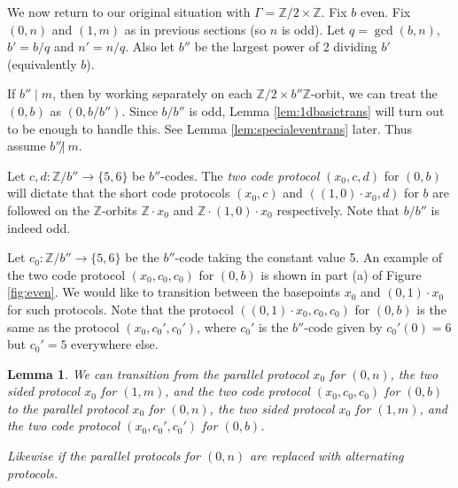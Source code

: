 \documentclass[10pt,a4paper]{article}
\newcommand{\0}{\varnothing}
\newcommand{\Z}{\mathbb{Z}}
\newtheorem{lemma}{Lemma}
\begin{document}
We now return to our original situation with $\Gamma = \Z/2 \times \Z$. Fix $b$ even. Fix $(0,n)$ and $(1,m)$ as in previous sections (so $n$ is odd). Let $q = \gcd(b,n)$, $b' = b/q$ and $n' = n/q$. Also let $b''$ be the largest power of 2 dividing $b'$ (equivalently $b$).

If $b'' \mid m$, then by working separately on each $\Z/2 \times b''\Z$-orbit, we can treat the $(0,b)$ as $(0,b/b'')$. Since $b/b''$ is odd, Lemma \ref{lem:1dbasictrans} will turn out to be enough to handle this. See Lemma \ref{lem:specialeventrans} later. Thus assume $b'' \not|\ m$.




Let $c,d :\Z/b'' \rightarrow \{5,6\}$ be $b''$-codes. The \textit{two code protocol} $(x_0,c,d)$ for $(0,b)$ will dictate that the short code protocols $(x_0,c)$ and $((1,0) \cdot x_0, d)$ for $b$ are followed on the $\Z$-orbits $\Z \cdot x_0$ and $\Z \cdot (1,0) \cdot x_0$ respectively. Note that $b/b''$ is indeed odd.

Let $c_0:\Z/b'' \rightarrow \{5,6\}$ be the $b''$-code taking the constant value 5. An example of the two code protocol $(x_0,c_0,c_0)$ for $(0,b)$ is shown in part (a) of Figure \ref{fig:even}. We would like to transition between the basepoints $x_0$ and $(0,1) \cdot x_0$ for such protocols. Note that the protocol $((0,1) \cdot x_0,c_0,c_0)$ for $(0,b)$ is the same as the protocol $(x_0,c_0',c_0')$, where $c_0'$ is the $b''$-code given by $c_0'(0) = 6$ but $c_0' = 5$ everywhere else.

\begin{lemma}\label{lem:eventrans}
We can transition from the parallel protocol $x_0$ for $(0,n)$, the two sided protocol $x_0$ for $(1,m)$, and the two code protocol $(x_0,c_0,c_0)$ for $(0,b)$ to the parallel protocol $x_0$ for $(0,n)$, the two sided protocol $x_0$ for $(1,m)$, and the two code protocol $(x_0,c_0',c_0')$ for $(0,b)$.

Likewise if the parallel protocols for $(0,n)$ are replaced with alternating protocols.
\end{lemma}
\end{document}
